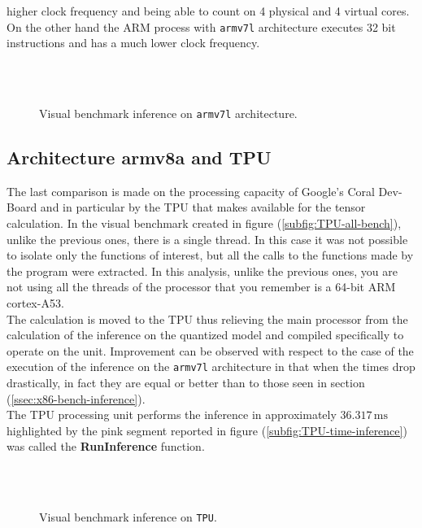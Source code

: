 higher clock frequency and being able to count on 4 physical and 4 virtual
cores. 
On the other hand the ARM process with \texttt{armv7l} architecture executes 32
bit instructions and has a much lower clock frequency.
%
\begin{figure}[htb]
	\centering
	 \\
	 \\
	\caption{Visual benchmark inference on \texttt{armv7l} architecture.}
	\label{fig:armv7l-bench}
\end{figure}
%
\subsection{Architecture armv8a and TPU}
\label{ssec:tpu}
%
%
The last comparison is made on the processing capacity of Google's Coral
Dev-Board and in particular by the TPU that makes available for the tensor
calculation.
In the visual benchmark created in figure (\ref{subfig:TPU-all-bench}), unlike 
the previous ones, there is a single thread.
In this case it was not possible to isolate only the functions of interest, but 
all the calls to the functions made by the program were extracted.
In this analysis, unlike the previous ones, you are not using all the threads of
the processor that you remember is a 64-bit ARM cortex-A53.\\ 
The calculation is moved to the TPU thus relieving the main processor from the
calculation of the inference on the quantized model and compiled specifically to
operate on the unit.
Improvement can be observed with respect to the case of the execution of the
inference on the \texttt{armv7l} architecture in that when the times drop
drastically, in fact they are equal or better than to those seen in section
(\ref{ssec:x86-bench-inference}).\\  
The TPU processing unit performs the inference in approximately $36.317
\,\si{\milli\second}$ highlighted by the pink segment reported in figure 
(\ref{subfig:TPU-time-inference}) was called the \textbf{RunInference} 
function.
%
%
\begin{figure}[htb]
	\centering
	 \\
	 \\
	\caption{Visual benchmark inference on \texttt{TPU}.}
	\label{fig:TPU-bench}
\end{figure}

